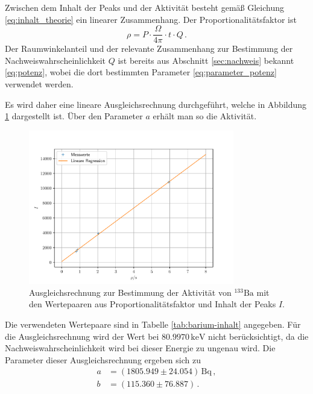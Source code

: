 \noindent
Zwischen dem Inhalt der Peaks und der Aktivität besteht gemäß Gleichung \ref{eq:inhalt_theorie}
ein linearer Zusammenhang. Der Proportionalitätsfaktor ist
\begin{equation}
    \rho = P \cdot \frac{\Omega}{4 \pi} \cdot t \cdot Q \, .
\end{equation}
Der Raumwinkelanteil und der relevante Zusammenhang zur Bestimmung der Nachweiswahrscheinlichkeit $Q$ ist bereits aus Abschnitt \ref{sec:nachweis} bekannt \eqref{eq:potenz},
wobei die dort bestimmten Parameter \eqref{eq:parameter_potenz} verwendet werden. 

Es wird daher eine lineare Ausgleichsrechnung durchgeführt, welche in Abbildung \ref{fig:ausgleichsrechnung-barium} dargestellt ist.
Über den Parameter $a$ erhält man so die Aktivität.
\begin{figure}
    \centering
    \includegraphics[width = 0.8\textwidth]{LineareRegression_Barium.pdf}
    \caption{Ausgleichsrechnung zur Bestimmung der Aktivität von $^{133}\text{Ba}$ mit den Wertepaaren aus Proportionalitätsfaktor und Inhalt der Peaks $I$.}
    \label{fig:ausgleichsrechnung-barium}
\end{figure}
Die verwendeten Wertepaare sind in Tabelle \ref{tab:barium-inhalt} angegeben. Für die Ausgleichsrechnung
wird der Wert bei $80.9970 \, \text{keV}$ nicht berücksichtigt, da die Nachweiswahrscheinlichkeit wird bei dieser Energie zu ungenau wird.
Die Parameter dieser Ausgleichsrechnung ergeben sich zu
\begin{align}
    a &= (1805.949 \pm 24.054) \, \text{Bq} \, , \\
    b &= (115.360 \pm 76.887) \, .
\end{align}
\FloatBarrier
